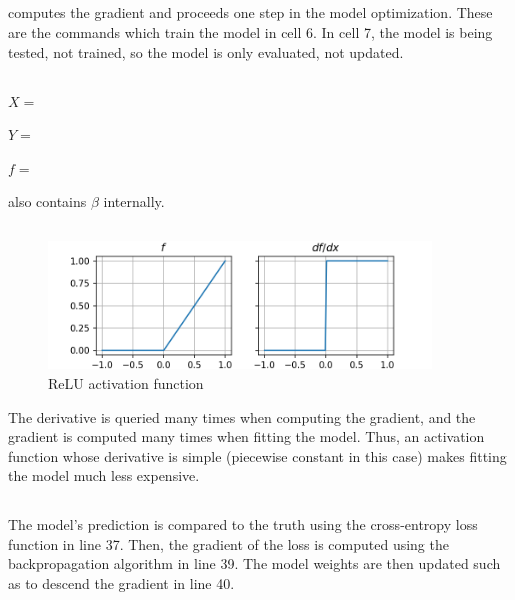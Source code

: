 \documentclass[11pt]{article}
\begin{document}
\subsection{}  %
 computes the gradient and
 proceeds one step in the model optimization.
These are the commands which train the model in cell 6. In cell 7, the model is
being tested, not trained, so the model is only evaluated, not updated.

\subsection{}  %
$X=$ 

$Y=$ 

$f=$ 

 also contains $\beta$ internally.

\subsection{}  %
\begin{figure}[H]
    \centering
    \includegraphics[width=4in]{8fig1.png}
    \caption{ReLU activation function}
    \label{8fig1}
\end{figure}
The derivative is queried many times when computing the gradient, and the
gradient is computed many times when fitting the model. Thus, an activation
function whose derivative is simple (piecewise constant in this case) makes
fitting the model much less expensive.

\subsection{}  %
The model's prediction is compared to the truth using the cross-entropy loss
function in line 37. Then, the gradient of the loss is computed using the
backpropagation algorithm in line 39. The model weights are then updated such as
to descend the gradient in line 40.
\end{document}
